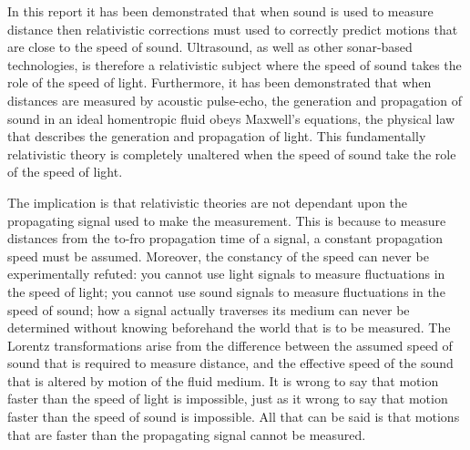 \documentclass[10pt, fleqn,final,showtrims,oldfontcommands, article,a4paper,oneside]{memoir} %
\begin{document}
In this report it has been demonstrated that when sound is used to measure distance %
then relativistic corrections must used to correctly predict motions that  are close to the speed of sound.
Ultrasound, as well as other sonar-based technologies, is therefore a relativistic subject
where  the  speed of sound takes the role of the speed of light.
Furthermore, it has been demonstrated that  when distances are measured by acoustic pulse-echo,
the generation and propagation of sound in an ideal homentropic fluid
obeys  Maxwell's equations, the  physical law that describes the generation and propagation of light.
This  fundamentally relativistic theory is completely unaltered when the speed of sound take the role of the speed of light.

The implication is that relativistic theories are not dependant upon the propagating signal used to make the measurement.
This is because to measure distances from the to-fro propagation time of a signal, 
a constant propagation speed must be assumed.
Moreover, the constancy of the speed can never be experimentally refuted: you cannot use light signals to measure fluctuations in the speed of light;
you cannot use sound signals to measure fluctuations in the speed of sound;
how a signal  actually traverses its medium can never be determined without knowing beforehand the world that is to be measured.
The Lorentz transformations arise from the difference between the assumed speed of sound that is required to measure distance,
and the effective speed of the sound that is altered by motion of the fluid medium.
It is  wrong to say that motion faster than the speed of light is impossible,
just as it wrong  to say that motion faster than the speed of sound is impossible.
All that can be said is that motions that are faster than the  propagating signal cannot be measured.






\end{document}
